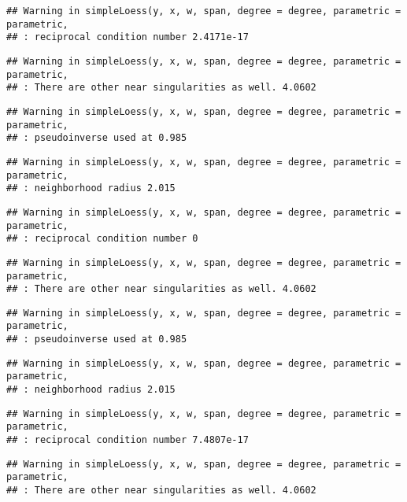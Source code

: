 \documentclass[
]{article}
\begin{document}
\begin{verbatim}
## Warning in simpleLoess(y, x, w, span, degree = degree, parametric = parametric,
## : reciprocal condition number 2.4171e-17
\end{verbatim}

\begin{verbatim}
## Warning in simpleLoess(y, x, w, span, degree = degree, parametric = parametric,
## : There are other near singularities as well. 4.0602
\end{verbatim}

\begin{verbatim}
## Warning in simpleLoess(y, x, w, span, degree = degree, parametric = parametric,
## : pseudoinverse used at 0.985
\end{verbatim}

\begin{verbatim}
## Warning in simpleLoess(y, x, w, span, degree = degree, parametric = parametric,
## : neighborhood radius 2.015
\end{verbatim}

\begin{verbatim}
## Warning in simpleLoess(y, x, w, span, degree = degree, parametric = parametric,
## : reciprocal condition number 0
\end{verbatim}

\begin{verbatim}
## Warning in simpleLoess(y, x, w, span, degree = degree, parametric = parametric,
## : There are other near singularities as well. 4.0602
\end{verbatim}

\begin{verbatim}
## Warning in simpleLoess(y, x, w, span, degree = degree, parametric = parametric,
## : pseudoinverse used at 0.985
\end{verbatim}

\begin{verbatim}
## Warning in simpleLoess(y, x, w, span, degree = degree, parametric = parametric,
## : neighborhood radius 2.015
\end{verbatim}

\begin{verbatim}
## Warning in simpleLoess(y, x, w, span, degree = degree, parametric = parametric,
## : reciprocal condition number 7.4807e-17
\end{verbatim}

\begin{verbatim}
## Warning in simpleLoess(y, x, w, span, degree = degree, parametric = parametric,
## : There are other near singularities as well. 4.0602
\end{verbatim}
\end{document}

